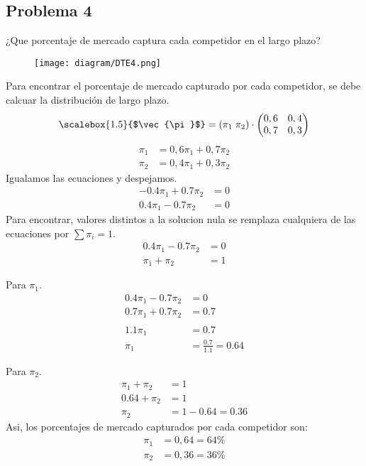 \documentclass{templateNote}
\begin{document}
\subsection{Problema 4}
¿Que porcentaje de mercado captura cada competidor en el largo plazo?
\begin{figure}[H]
    \centering
    \texttt{[image: diagram/DTE4.png]}
\end{figure}
Para encontrar el porcentaje de mercado capturado por cada competidor, se debe calcuar la distribución de largo plazo.
\begin{equation*}
    \scalebox{1.5}{$\vec{\pi}$} = \left(\pi_1 \; \pi_2\right) \cdot \left(\begin{matrix}
        0,6 & 0,4 \\
        0,7 & 0,3
    \end{matrix}\right)
\end{equation*}
\begin{eqnarray*}
    \pi_1 &= 0,6 \pi_1 + 0,7 \pi_2 \\
    \pi_2 &= 0,4 \pi_1 + 0,3 \pi_2
\end{eqnarray*}
Igualamos las ecuaciones y despejamos.
\begin{eqnarray*}
    -0.4 \pi_1 + 0.7 \pi_2 &= 0 \\
    0.4 \pi_1 - 0.7 \pi_2 &= 0
\end{eqnarray*}
Para encontrar, valores distintos a la solucion nula se remplaza cualquiera de las ecuaciones por $\sum \pi_i = 1$.
\begin{eqnarray*}
    0.4 \pi_1 - 0.7 \pi_2 &= 0 \\
    \pi_1 + \pi_2 &= 1
\end{eqnarray*}

Para $\pi_1$.
\begin{align*}
    0.4 \pi_1 - 0.7 \pi_2 &= 0 \\
    0.7 \pi_1 + 0.7 \pi_2 &= 0.7 \\
    \\
    1.1 \pi_1 &= 0.7 \\
    \pi_1 &= \frac{0.7}{1.1} = 0.64
\end{align*}

Para $\pi_2$.
\begin{align*}
    \pi_1 + \pi_2 &= 1 \\
    0.64 + \pi_2 &= 1 \\
    \pi_2 &= 1 - 0.64 = 0.36
\end{align*}
Asi, los porcentajes de mercado capturados por cada competidor son:
\begin{eqnarray*}
    \pi_1 &= 0,64 = 64\% \\
    \pi_2 &= 0,36 = 36\%
\end{eqnarray*}
\end{document}
